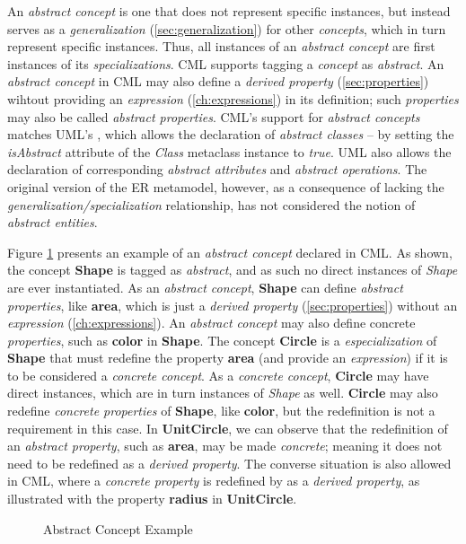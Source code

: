 \begin{definition}
An \emph{abstract concept} is one that does not represent specific instances,
but instead serves as a \emph{generalization} (\ref{sec:generalization}) 
for other \emph{concepts},
which in turn represent specific instances.
Thus, all instances of an \emph{abstract concept}
are first instances of its \emph{specializations}.
CML supports tagging a \emph{concept} as \emph{abstract}.
An \emph{abstract concept} in CML may also define a \emph{derived property} (\ref{sec:properties})
wihtout providing an \emph{expression} (\ref{ch:expressions}) in its definition;
such \emph{properties} may also be called \emph{abstract properties}.
CML's support for \emph{abstract concepts} matches UML's \cite{uml},
which allows the declaration of \emph{abstract classes}
-- by setting the \emph{isAbstract} attribute of the \emph{Class} metaclass instance to \emph{true}.
UML also allows the declaration of corresponding \emph{abstract attributes} and \emph{abstract operations}.
The original version of the ER \cite{er} metamodel, however,
as a consequence of lacking the \emph{generalization/specialization} relationship,
has not considered the notion of \emph{abstract entities}.
\end{definition}

\begin{examples}
Figure \ref{fig:ex:abstract} presents an example of an \emph{abstract concept} declared in CML.
As shown, the concept \textbf{Shape} is tagged as \emph{abstract},
and as such no direct instances of \emph{Shape} are ever instantiated.
As an \emph{abstract concept}, \textbf{Shape} can define \emph{abstract properties},
like \textbf{area}, which is just a \emph{derived property} (\ref{sec:properties})
without an \emph{expression} (\ref{ch:expressions}).
An \emph{abstract concept} may also define concrete \emph{properties},
such as \textbf{color} in \textbf{Shape}.
The concept \textbf{Circle} is a \emph{especialization} of \textbf{Shape}
that must redefine the property \textbf{area}
(and provide an \emph{expression})
if it is to be considered a \emph{concrete concept}.
As a \emph{concrete concept},
\textbf{Circle} may have direct instances,
which are in turn instances of \emph{Shape} as well.
\textbf{Circle} may also redefine \emph{concrete properties} of \textbf{Shape},
like \textbf{color},
but the redefinition is not a requirement in this case.
In \textbf{UnitCircle},
we can observe that the redefinition of an \emph{abstract property},
such as \textbf{area},
may be made \emph{concrete};
meaning it does not need to be redefined as a \emph{derived property}.
The converse situation is also allowed in CML,
where a \emph{concrete property} is redefined by as a \emph{derived property},
as illustrated with the property \textbf{radius} in \textbf{UnitCircle}.
\end{examples}

\begin{figure}
\verbatimfont{\small}

\caption{Abstract Concept Example}
\label{fig:ex:abstract}
\end{figure}
